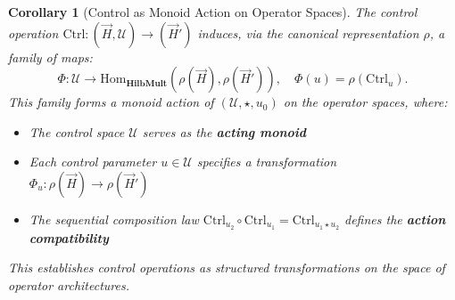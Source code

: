 \documentclass[11pt]{article}
\newtheorem{corollary}{Corollary}
\begin{document}
\begin{corollary}[Control as Monoid Action on Operator Spaces]\label{cor:control-monoid-action}
The control operation $\mathrm{Ctrl}: (\vec{H}, \mathcal{U}) \to (\vec{H}')$ induces, via the canonical representation $\rho$, a family of maps:
\[
\Phi: \mathcal{U} \to \mathrm{Hom}_{\mathbf{HilbMult}}(\rho(\vec{H}), \rho(\vec{H}')), \quad \Phi(u) = \rho(\mathrm{Ctrl}_u).
\]
This family forms a monoid action of $(\mathcal{U}, \star, u_0)$ on the operator spaces, where:
\begin{itemize}
    \item The control space $\mathcal{U}$ serves as the \textbf{acting monoid}
    \item Each control parameter $u \in \mathcal{U}$ specifies a transformation $\Phi_u: \rho(\vec{H}) \to \rho(\vec{H}')$
    \item The sequential composition law $\mathrm{Ctrl}_{u_2} \circ \mathrm{Ctrl}_{u_1} = \mathrm{Ctrl}_{u_1 \star u_2}$ defines the \textbf{action compatibility}
\end{itemize}
This establishes control operations as structured transformations on the space of operator architectures.
\end{corollary}
\end{document}
